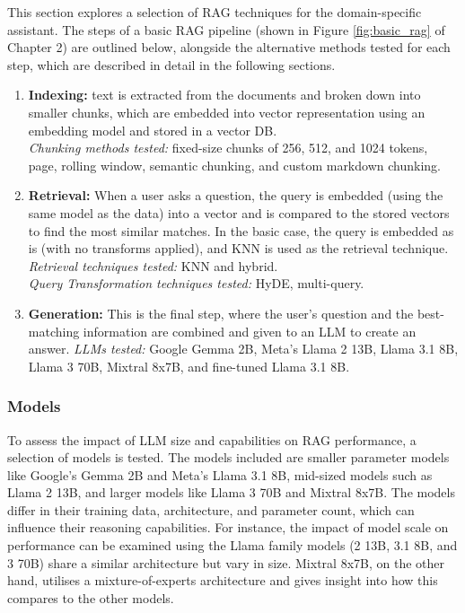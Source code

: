 This section explores a selection of RAG techniques for the domain-specific assistant. The steps of a basic RAG pipeline (shown in Figure \ref{fig:basic_rag} of Chapter 2) are outlined below, alongside the alternative methods tested for each step, which are described in detail in the following sections.

\begin{enumerate}
    \item \textbf{Indexing:} text is extracted from the documents and broken down into smaller chunks, which are embedded into vector representation using an embedding model and stored in a vector DB. \\
    \textit{Chunking methods tested:} fixed-size chunks of 256, 512, and 1024 tokens, page, rolling window, semantic chunking, and custom markdown chunking.
    \item \textbf{Retrieval:} When a user asks a question, the query is embedded (using the same model as the data) into a vector and is compared to the stored vectors to find the most similar matches. In the basic case, the query is embedded as is (with no transforms applied), and KNN is used as the retrieval technique.\\
    \textit{Retrieval techniques tested:} KNN and hybrid.\\
    \textit{Query Transformation techniques tested:} HyDE, multi-query.
    \item \textbf{Generation: }This is the final step, where the user's question and the best-matching information are combined and given to an LLM to create an answer.
    \textit{LLMs tested:} Google Gemma 2B, Meta’s Llama 2 13B, Llama 3.1 8B, Llama 3 70B, Mixtral 8x7B, and fine-tuned Llama 3.1 8B.
\end{enumerate}


\subsubsection{Models}


To assess the impact of LLM size and capabilities on RAG performance, a selection of models is tested. The models included are smaller parameter models like Google's Gemma 2B and Meta's Llama 3.1 8B, mid-sized models such as Llama 2 13B, and larger models like Llama 3 70B and Mixtral 8x7B. The models differ in their training data, architecture, and parameter count, which can influence their reasoning capabilities. For instance, the impact of model scale on performance can be examined using the Llama family models (2 13B, 3.1 8B, and 3 70B) share a similar architecture but vary in size. Mixtral 8x7B, on the other hand, utilises a mixture-of-experts architecture \cite{shazeer2017outrageouslylargeneuralnetworks} and gives insight into how this compares to the other models. \\

